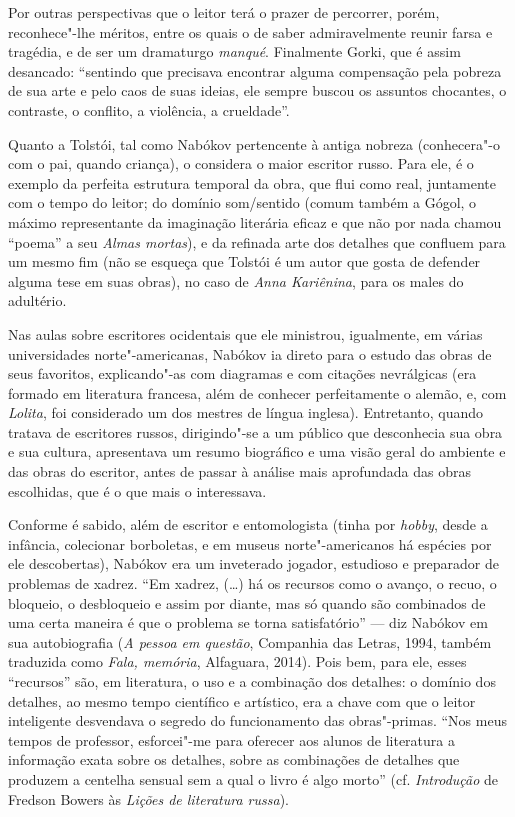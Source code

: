 Por outras perspectivas que o leitor terá o prazer de percorrer, porém,
reconhece"-lhe méritos, entre os quais o de saber admiravelmente reunir
farsa e tragédia, e de ser um dramaturgo \emph{manqué}. Finalmente
Gorki, que é assim desancado: ``sentindo que precisava encontrar alguma
compensação pela pobreza de sua arte e pelo caos de suas ideias, ele
sempre buscou os assuntos chocantes, o contraste, o conflito, a
violência, a crueldade''.

Quanto a Tolstói, tal como Nabókov pertencente à antiga nobreza
(conhecera"-o com o pai, quando criança), o considera o maior escritor
russo. Para ele, é o exemplo da perfeita estrutura temporal da obra, que
flui como real, juntamente com o tempo do leitor; do domínio som/sentido
(comum também a Gógol, o máximo representante da imaginação literária
eficaz e que não por nada chamou ``poema'' a seu \emph{Almas mortas}),
e da refinada arte dos detalhes que confluem para um mesmo fim (não se
esqueça que Tolstói é um autor que gosta de defender alguma tese em suas
obras), no caso de \emph{Anna Kariênina}, para os males do adultério.

Nas aulas sobre escritores ocidentais que ele ministrou, igualmente, em
várias universidades norte"-americanas, Nabókov ia direto para o estudo das
obras de seus favoritos, explicando"-as com diagramas e com citações
nevrálgicas (era formado em literatura francesa, além de conhecer
perfeitamente o alemão, e, com \emph{Lolita}, foi considerado um dos
mestres de língua inglesa). Entretanto, quando tratava de escritores
russos, dirigindo"-se a um público que desconhecia sua obra e sua
cultura, apresentava um resumo biográfico e uma visão geral do ambiente
e das obras do escritor, antes de passar à análise mais aprofundada das
obras escolhidas, que é o que mais o interessava.

Conforme é sabido, além de escritor e entomologista (tinha por
\emph{hobby}, desde a infância, colecionar borboletas, e em museus
norte"-americanos há espécies por ele descobertas), Nabókov era um inveterado
jogador, estudioso e preparador de problemas de xadrez. ``Em xadrez,
(\ldots{}) há os recursos como o avanço, o recuo, o bloqueio, o desbloqueio e
assim por diante, mas só quando são combinados de uma certa maneira é
que o problema se torna satisfatório'' --- diz Nabókov em sua
autobiografia (\emph{A pessoa em questão}, Companhia das Letras, 1994,
também traduzida como \emph{Fala, memória}, Alfaguara, 2014). Pois bem,
para ele, esses ``recursos'' são, em literatura, o uso e a combinação
dos detalhes: o domínio dos detalhes, ao mesmo tempo científico e
artístico, era a chave com que o leitor inteligente desvendava o segredo
do funcionamento das obras"-primas. ``Nos meus tempos de professor,
esforcei"-me para oferecer aos alunos de literatura a informação exata
sobre os detalhes, sobre as combinações de detalhes que produzem a
centelha sensual sem a qual o livro é algo morto'' (cf. \emph{Introdução}
de Fredson Bowers às \emph{Lições de literatura russa}).

